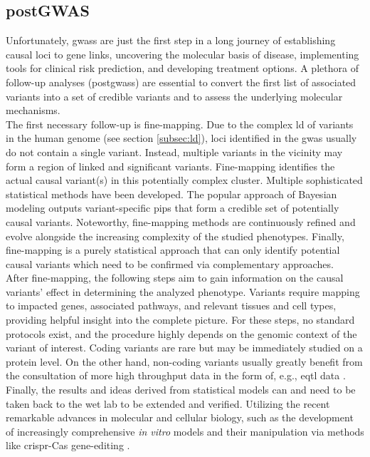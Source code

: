     \subsection{postGWAS}
    \label{subsec:gwas_limit}
    Unfortunately, \acp{gwas} are just the first step in a long journey of establishing causal loci to gene links, uncovering the molecular basis of disease, implementing tools for clinical risk prediction, and developing treatment options. A plethora of follow-up analyses (post\acp{gwas}) are essential to convert the first list of associated variants into a set of credible variants and to assess the underlying molecular mechanisms.\\
    The first necessary follow-up is fine-mapping. Due to the complex \ac{ld} of variants in the human genome (see section \ref{subsec:ld}), loci identified in the \ac{gwas} usually do not contain a single variant. Instead, multiple variants in the vicinity may form a region of linked and significant variants. Fine-mapping identifies the actual causal variant(s) in this potentially complex cluster. Multiple sophisticated statistical methods have been developed. The popular approach of Bayesian modeling outputs variant-specific \acp{pip} that form a credible set of potentially causal variants. Noteworthy, fine-mapping methods are continuously refined and evolve alongside the increasing complexity of the studied phenotypes. Finally, fine-mapping is a purely statistical approach that can only identify potential causal variants which need to be confirmed via complementary approaches. \cite{schaidGenomewideAssociationsCandidate2018, uffelmannGenomewideAssociationStudies2021}\\
    After fine-mapping, the following steps aim to gain information on the causal variants' effect in determining the analyzed phenotype. Variants require mapping to impacted genes, associated pathways, and relevant tissues and cell types, providing helpful insight into the complete picture. For these steps, no standard protocols exist, and the procedure highly depends on the genomic context of the variant of interest. Coding variants are rare but may be immediately studied on a protein level. On the other hand, non-coding variants usually greatly benefit from the consultation of more high throughput data in the form of, e.g., \ac{eqtl} data \cite{uffelmannGenomewideAssociationStudies2021}.\\
    Finally, the results and ideas derived from statistical models can and need to be taken back to the wet lab to be extended and verified. Utilizing the recent remarkable advances in molecular and cellular biology, such as the development of increasingly comprehensive \textit{in vitro} models and their manipulation via methods like \ac{crispr}-Cas gene-editing \cite{lichouFunctionalStudiesGWAS2020}.


